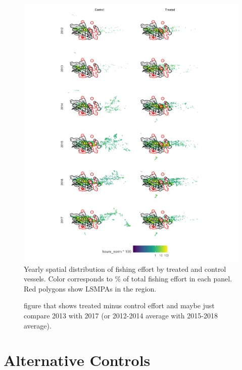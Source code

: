 \documentclass[9p,twocolumn,twoside,lineno]{pnas-new}
\begin{document}
\begin{figure}
\centering
\includegraphics{img/fishing_raster.png}
\caption{\label{fig:fishing_raster}Yearly spatial distribution of fishing effort by treated and control vessels. Color corresponds to \% of total fishing effort in each panel. Red polygons show LSMPAs in the region.}
\end{figure}

\begin{figure}
\centering
\caption{figure that shows treated minus control effort and maybe just compare 2013 with 2017 (or 2012-2014 average with 2015-2018 average).}
\end{figure}


\section{Alternative Controls}

\end{document}
